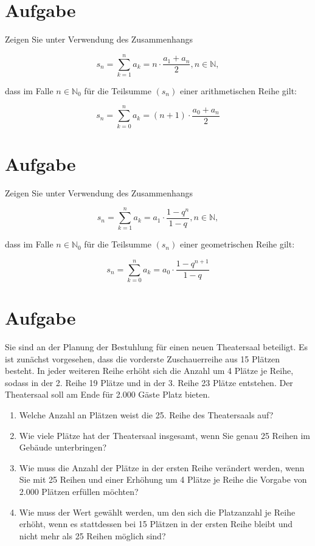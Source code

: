 \documentclass[fontsize=11pt, parskip=half]{scrartcl}
\newcommand{\N}{\mathbb{N}}
\begin{document}
\section{Aufgabe}
Zeigen Sie unter Verwendung des Zusammenhangs

$$ s_n =  \displaystyle \sum_{k=1}^n a_k = n \cdot \frac{a_1 +a_n}{2}, n \in \N,$$

dass im Falle $n \in \N_0$ für die Teilsumme $(s_n)$ einer
arithmetischen Reihe gilt:

$$ s_n =  \displaystyle \sum_{k=0}^n a_k = (n+1) \cdot \frac{a_0 +
a_n}{2}
$$

\section{Aufgabe}
Zeigen Sie unter Verwendung des Zusammenhangs

$$ s_n =  \displaystyle \sum_{k=1}^n a_k = a_1 \cdot \frac{1 -
q^n}{1-q}, n \in \N,
$$

dass im Falle $n \in \N_0$ für die Teilsumme $(s_n)$ einer
geometrischen Reihe gilt:

$$ s_n =  \displaystyle \sum_{k=0}^n a_k = a_0 \cdot \frac{1 -
q^{n+1}}{1-q}
$$

\section{Aufgabe}
Sie sind an der Planung der Bestuhlung für einen neuen
Theatersaal beteiligt. Es ist zunächst vorgesehen, dass die
vorderste Zuschauerreihe aus 15 Plätzen besteht. In jeder weiteren
Reihe erhöht sich die Anzahl um 4 Plätze je Reihe, sodass in der 2.
Reihe 19 Plätze und in der 3. Reihe 23 Plätze entstehen. Der Theatersaal soll am Ende für 2.000 Gäste Platz bieten.\\[-0.5cm]

\begin{enumerate}[label=\alph*)]
\item Welche Anzahl an Plätzen weist die 25. Reihe des Theatersaals auf? 
\item Wie viele Plätze hat der Theatersaal insgesamt, wenn Sie genau 25 Reihen im Gebäude
unterbringen?
\item Wie muss die Anzahl der Plätze in der ersten Reihe verändert werden,
wenn Sie mit 25 Reihen und einer Erhöhung um 4 Plätze
je Reihe die Vorgabe von 2.000 Plätzen erfüllen möchten?
\item Wie muss der Wert gewählt werden, um den sich die Platzanzahl je Reihe erhöht, wenn es stattdessen bei 15 Plätzen in der ersten Reihe bleibt und
nicht mehr als 25 Reihen möglich sind?
\end{enumerate}
\end{document}
